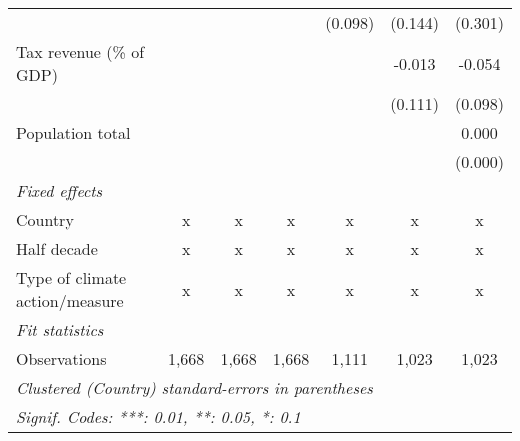 \begin{tabular}{lcccccc}
                                                     &               &               &                & (0.098)       & (0.144)      & (0.301)\\   
   Tax revenue (\% of GDP)                           &               &               &                &               & -0.013       & -0.054\\   
                                                     &               &               &                &               & (0.111)      & (0.098)\\   
   Population total                                  &               &               &                &               &              & 0.000\\   
                                                     &               &               &                &               &              & (0.000)\\   
   \emph{Fixed effects}\\
   Country                                           & x             & x             & x              & x             & x            & x\\  
   Half decade                                       & x             & x             & x              & x             & x            & x\\  
   Type of climate action/measure                    & x             & x             & x              & x             & x            & x\\  
   \midrule \emph{Fit statistics}\\
   Observations                                      & 1,668         & 1,668         & 1,668          & 1,111         & 1,023        & 1,023\\  
   \midrule
   \multicolumn{7}{l}{\emph{Clustered (Country) standard-errors in parentheses}}\\
   \multicolumn{7}{l}{\emph{Signif. Codes: ***: 0.01, **: 0.05, *: 0.1}}\\
\end{tabular}
\par\endgroup


